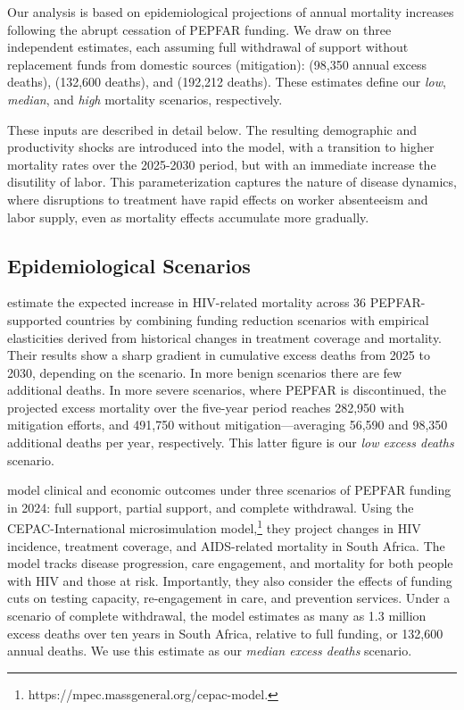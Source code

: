 \documentclass[letterpaper,12pt]{article}
\theoremstyle{definition}
\begin{document}
\begin{spacing}{1.5}
Our analysis is based on epidemiological projections of annual mortality increases following the abrupt cessation of PEPFAR funding. We draw on three independent estimates, each assuming full withdrawal of support without replacement funds from domestic sources (mitigation): \citet{Brink2025} (98,350 annual excess deaths), \citet{Gandhi2025} (132,600 deaths), and \citet{KS2025} (192,212 deaths). These estimates define our \textit{low}, \textit{median}, and \textit{high} mortality scenarios, respectively.

These inputs are described in detail below. The resulting demographic and productivity shocks are introduced into the model, with a transition to higher mortality rates over the 2025-2030 period, but with an immediate increase the disutility of labor. This parameterization captures the nature of disease dynamics, where disruptions to treatment have rapid effects on worker absenteeism and labor supply, even as mortality effects accumulate more gradually.


\subsection{Epidemiological Scenarios}

 estimate the expected increase in HIV-related mortality across 36 PEPFAR-supported countries by combining funding reduction scenarios with empirical elasticities derived from historical changes in treatment coverage and mortality. Their results show a sharp gradient in cumulative excess deaths from 2025 to 2030, depending on the scenario. In more benign scenarios there are few additional deaths. In more severe scenarios, where PEPFAR is discontinued, the projected excess mortality over the five-year period reaches 282,950 with mitigation efforts, and 491,750 without mitigation—averaging 56,590 and 98,350 additional deaths per year, respectively. This latter figure is our \textit{low excess deaths} scenario.

\citet{Gandhi2025} model clinical and economic outcomes under three scenarios of PEPFAR funding in 2024: full support, partial support, and complete withdrawal. Using the CEPAC-International microsimulation model,\footnote{https://mpec.massgeneral.org/cepac-model.} they project changes in HIV incidence, treatment coverage, and AIDS-related mortality in South Africa. The model tracks disease progression, care engagement, and mortality for both people with HIV and those at risk. Importantly, they also consider the effects of funding cuts on testing capacity, re-engagement in care, and prevention services. Under a scenario of complete withdrawal, the model estimates as many as 1.3 million excess deaths over ten years in South Africa, relative to full funding, or 132,600 annual deaths. We use this estimate as our \textit{median excess deaths} scenario.


\end{spacing}
\end{document}
